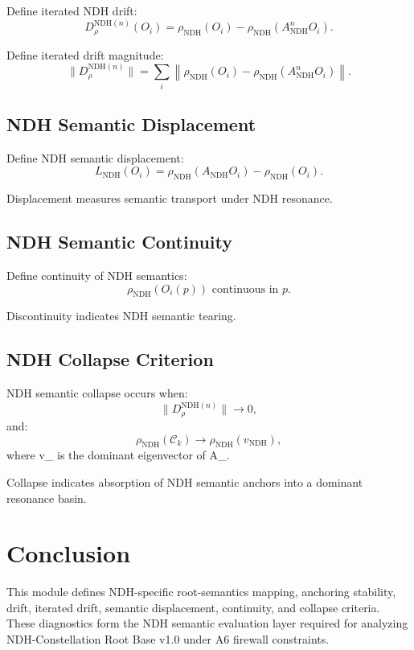 Define iterated NDH drift:
\[
D_{\rho}^{\mathrm{NDH}(n)}(O_i)
  = \rho_{\mathrm{NDH}}(O_i)
  - \rho_{\mathrm{NDH}}(A_{\mathrm{NDH}}^n O_i).
\]

Define iterated drift magnitude:
\[
\|D_{\rho}^{\mathrm{NDH}(n)}\|
  = \sum_i \left\| \rho_{\mathrm{NDH}}(O_i)
  - \rho_{\mathrm{NDH}}(A_{\mathrm{NDH}}^n O_i) \right\|.
\]

\subsection{NDH Semantic Displacement}

Define NDH semantic displacement:
\[
L_{\mathrm{NDH}}(O_i)
  = \rho_{\mathrm{NDH}}(A_{\mathrm{NDH}} O_i)
  - \rho_{\mathrm{NDH}}(O_i).
\]

Displacement measures semantic transport under NDH resonance.

\subsection{NDH Semantic Continuity}

Define continuity of NDH semantics:
\[
\rho_{\mathrm{NDH}}(O_i(p)) \text{ continuous in } p.
\]

Discontinuity indicates NDH semantic tearing.

\subsection{NDH Collapse Criterion}

NDH semantic collapse occurs when:
\[
\|D_{\rho}^{\mathrm{NDH}(n)}\| \to 0,
\]
and:
\[
\rho_{\mathrm{NDH}}(\mathcal{C}_k) \to \rho_{\mathrm{NDH}}(v_{\mathrm{NDH}}),
\]
where v_{} is the dominant eigenvector of A_{}.

Collapse indicates absorption of NDH semantic anchors into a dominant
resonance basin.

\section{Conclusion}

This module defines NDH-specific root-semantics mapping, anchoring
stability, drift, iterated drift, semantic displacement, continuity, and
collapse criteria. These diagnostics form the NDH semantic evaluation layer
required for analyzing NDH-Constellation Root Base v1.0 under A6 firewall
constraints.
